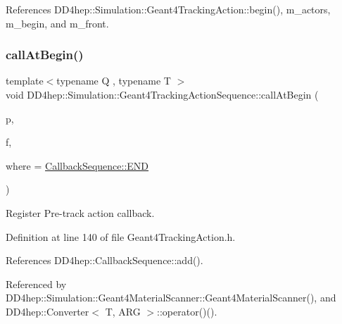 References D\+D4hep\+::\+Simulation\+::\+Geant4\+Tracking\+Action\+::begin(), m\+\_\+actors, m\+\_\+begin, and m\+\_\+front.

\hypertarget{class_d_d4hep_1_1_simulation_1_1_geant4_tracking_action_sequence_a43f9d8c580c0187a4972469306b0137e}{}\label{class_d_d4hep_1_1_simulation_1_1_geant4_tracking_action_sequence_a43f9d8c580c0187a4972469306b0137e} 
\subsubsection{\texorpdfstring{call\+At\+Begin()}{callAtBegin()}}
{\footnotesize\ttfamily template$<$typename Q , typename T $>$ \\
void D\+D4hep\+::\+Simulation\+::\+Geant4\+Tracking\+Action\+Sequence\+::call\+At\+Begin (\begin{DoxyParamCaption}\item[{Q $\ast$}]{p,  }\item[{void(T\+::$\ast$)(const G4\+Track $\ast$)}]{f,  }\item[{\hyperlink{struct_d_d4hep_1_1_callback_sequence_a7753490247479633aed16a2376821ef7}{Callback\+Sequence\+::\+Location}}]{where = {\ttfamily \hyperlink{struct_d_d4hep_1_1_callback_sequence_a7753490247479633aed16a2376821ef7ac39eeb1bcfc1c235ab1d0d9315c310ac}{Callback\+Sequence\+::\+E\+ND}} }\end{DoxyParamCaption})\hspace{0.3cm}{\ttfamily [inline]}}



Register Pre-\/track action callback. 



Definition at line 140 of file Geant4\+Tracking\+Action.\+h.



References D\+D4hep\+::\+Callback\+Sequence\+::add().



Referenced by D\+D4hep\+::\+Simulation\+::\+Geant4\+Material\+Scanner\+::\+Geant4\+Material\+Scanner(), and D\+D4hep\+::\+Converter$<$ T, A\+R\+G $>$\+::operator()().

\hypertarget{class_d_d4hep_1_1_simulation_1_1_geant4_tracking_action_sequence_afdbe23daf4e6f3e639916b24c4f4de7a}{}\label{class_d_d4hep_1_1_simulation_1_1_geant4_tracking_action_sequence_afdbe23daf4e6f3e639916b24c4f4de7a} 
